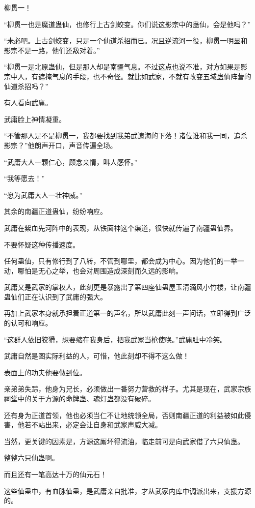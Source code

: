 \begin{this_body}
柳贯一！

“柳贯一也是魔道蛊仙，也修行上古剑蛟变。你们说这影宗中的蛊仙，会是他吗？”

“未必吧。上古剑蛟变，只是一个仙道杀招而已。况且逆流河一役，柳贯一明显和影宗不是一路，他们还敌对着。”

“柳贯一是北原蛊仙，但是那人却是南疆气息。不过这点也说不准，对方如果是影宗中人，有遮掩气息的手段，也不奇怪。就比如武家，不就有改变五域蛊仙阵营的仙道杀招吗？”

有人看向武庸。

武庸脸上神情凝重。

“不管那人是不是柳贯一，我都要找到我弟武遗海的下落！诸位谁和我一同，追杀影宗？”他朗声开口，声音传遍全场。

“武庸大人一颗仁心，顾念亲情，叫人感怀。”

“我等愿去！”

“愿为武庸大人一壮神威。”

其余的南疆正道蛊仙，纷纷响应。

武庸在紫血先河阵中的表现，从铁面神这个渠道，很快就传遍了南疆蛊仙界。

不要怀疑这种传播速度。

任何蛊仙，只有修行到了八转，不管到哪里，都会成为中心。因为他们的一举一动，哪怕是无心之举，也会对周围造成深刻而久远的影响。

武庸又是武家的掌权人，此刻更是暴露出了第四座仙蛊屋玉清滴风小竹楼，让南疆蛊仙们正在认识到了武庸的强大。

再加上武家本身就承担着正道第一的声名，所以武庸此刻一声问话，立即得到广泛的认可和响应。

“这群人依旧狡猾，想要缩在我身后，把我武家当枪使唤。”武庸肚中冷笑。

武庸自然是图实际利益的人，可惜，他此刻却不得不这么做！

表面上的功夫他要做到位。

亲弟弟失踪，他身为兄长，必须做出一番努力营救的样子。尤其是现在，武家宗族祠堂中的关于方源的命牌蛊、魂灯蛊都没有破碎。

还有身为正道首领，他也必须当仁不让地统领全局，否则南疆正道的利益被如此侵害，他若不站出来，必定会让自身和武家声威大减。

当然，更关键的因素是，方源这厮坏得流油，临走前可是向武家借了六只仙蛊。

整整六只仙蛊啊。

而且还有一笔高达十万的仙元石！

这些仙蛊中，有血脉仙蛊，是武庸亲自批准，才从武家内库中调派出来，支援方源的。


\end{this_body}
